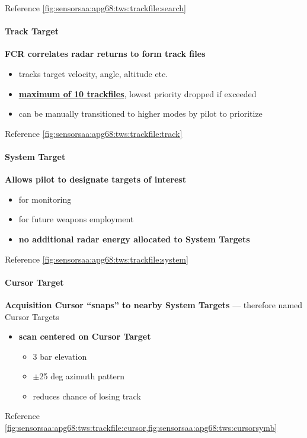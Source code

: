 Reference \cref{fig:sensorsaa:apg68:tws:trackfile:search}

\paragraph{Track Target}
\textbf{FCR correlates radar returns to form track files}
\begin{itemize}
\item tracks target velocity, angle, altitude etc.
\item \textbf{\underline{maximum of 10 trackfiles}}, lowest priority dropped if exceeded
\item can be manually transitioned to higher modes by pilot to prioritize
\end{itemize}

Reference \cref{fig:sensorsaa:apg68:tws:trackfile:track}

\paragraph{System Target}
\textbf{Allows pilot to designate targets of interest}
\begin{itemize}
    \item for monitoring
    \item for future weapons employment
    \item \textbf{no additional radar energy allocated to System Targets}
\end{itemize}

Reference \cref{fig:sensorsaa:apg68:tws:trackfile:system}

\paragraph{Cursor Target}
\textbf{Acquisition Cursor ``snaps'' to nearby System Targets} --- therefore named Cursor Targets
\begin{itemize}
    \item \textbf{scan centered on Cursor Target}
    \begin{itemize}
        \item 3 bar elevation
        \item $\pm$25 deg azimuth pattern 
        \item reduces chance of losing track
    \end{itemize}
\end{itemize}

Reference \cref{fig:sensorsaa:apg68:tws:trackfile:cursor,fig:sensorsaa:apg68:tws:cursorsymb}

